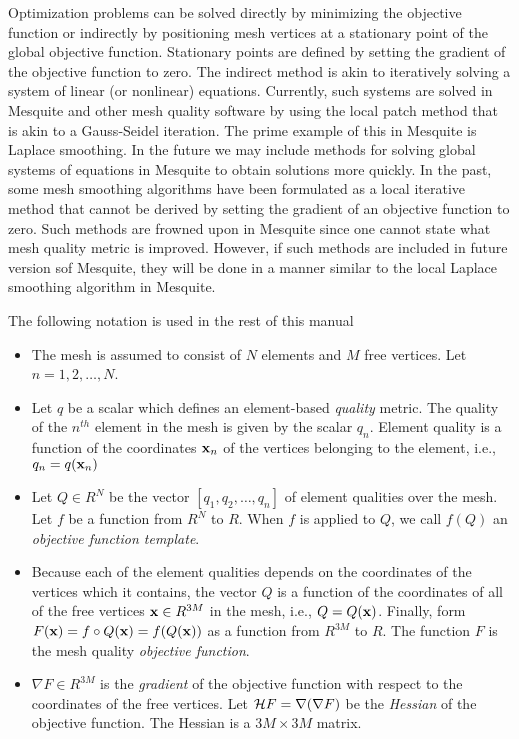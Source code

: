 Optimization problems can be solved directly by minimizing the objective 
function or indirectly by positioning mesh vertices at a stationary point
of the global objective function. Stationary points are defined by setting 
the gradient of the objective function to zero. The indirect method is akin 
to iteratively solving a system of linear (or nonlinear) equations. 
Currently, such systems are solved in Mesquite and other mesh quality 
software by using the local patch method that is akin 
to a Gauss-Seidel iteration. The prime example of this in Mesquite is 
Laplace smoothing. In the 
future we may include methods for solving global systems of equations 
in Mesquite to obtain solutions more quickly. 
In the past, some mesh smoothing algorithms have been formulated as a 
local iterative method that cannot be derived  
by setting the gradient of an objective function to zero. Such methods are
frowned upon in Mesquite since one cannot state what mesh quality metric is
improved.  However, if such methods are included in future version sof Mesquite, they will be done in a manner similar to the local Laplace smoothing 
algorithm in Mesquite. \newline

\noindent The following notation is used in the rest of this manual
\begin{itemize}
\item The mesh is assumed to consist of $N$ elements and $M$ free vertices.  
Let $n=1,2,\ldots,N$.
\item Let $q$ be a scalar which defines an element-based {\it quality} metric. 
The quality of the $n^{th}$ element in the mesh is given by the scalar 
$q_n$. Element quality is a function of the coordinates ${\bf x}_n$ 
of the vertices belonging to the element, i.e., $q_n = q({\bf x}_n)$
\item Let $Q \in R^N$ be the vector $[q_1,q_2,\ldots,q_n]$ of element 
qualities over the mesh. Let $f$ be a function from $R^N$ to $R$. When  
$f$ is applied to $Q$, we call $f(Q)$ an {\it objective function template}.
\item Because each of the element qualities depends on the coordinates of
the vertices which it contains, the vector $Q$ is a function of the coordinates
of all of the free vertices ${\bf x} \in R^{3M}$ in the mesh, i.e., $Q=Q({\bf x})$. Finally, form $F({\bf x})= f \circ Q({\bf x}) = f(Q({\bf x}))$ as a 
function from $R^{3M}$ to $R$.  The function $F$ is the mesh quality 
{\it objective function}. 
\item $\nabla F \in R^{3M}$ is the {\it gradient} of the objective function 
with respect to the coordinates of the free vertices. Let ${\cal H} F= \nabla (\nabla F)$ be the {\it Hessian} of the objective function.  The Hessian is a 
$3M \times 3M$ matrix. 
\end{itemize}

